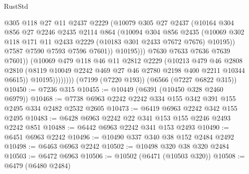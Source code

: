 \begin{lexlean}{RustStd}
\begin{coremodule}
                            @305
                            @118
                            @27
                            @11
                            @2437
                            @2229
                            (@10079
                              @305
                              @27
                              @2437
                              (@10164
                                @304
                                @856
                                @27
                                @2246
                                @2435
                                @2114
                                @864
                                (@10094
                                  @304
                                  @856
                                  @2435
                                  (@10069
                                    @302
                                    @118
                                    @171
                                    @11
                                    @2433
                                    @2229
                                    (@10183 @301 @2433 @7672 @7676)
                                    @10195))
                                @7587
                                @7590
                                @7593
                                @7596
                                @7601))
                            @10195)))
                      @7630
                      @7633
                      @7636
                      @7639
                      @7601))
                  (@10069
                    @479
                    @118
                    @46
                    @11
                    @2812
                    @2229
                    (@10213
                      @479
                      @46
                      @2808
                      @2810
                      (@8119 @10049 @2242 @469 @27 @46 @2780 @2198 @400 @2211 @10344 @6615))
                    @10195))))))))
    (@7199 (@7220 @193))
    (@6566 (@7227 @6822 @315))
@10450 := @7236 @315
@10455 := @10449 (@6391 (@10450 @328 @2460 @6979))
@10468 := @7738 @6963 @2242 @2242 @334 @155 @342 @391 @155 @2495 @334 @2482 @2532 @2605
@10473 := @6419 @6963 @2242 @342 @155 @2495
@10483 := @6428 @6963 @2242 @22 @341 @153 @155 @2246 @2493 @2242 @851
@10488 := @6442 @6963 @2242 @341 @153 @2493
@10490 := @6451 @6963 @2242
@10496 := @10490 @337 @340 @38 @152 @2484 @2492
@10498 := @6463 @6963 @2242
@10502 := @10498 @320 @38 @320 @2484
@10503 := @6472 @6963
@10506 := @10502 (@6471 (@10503 @320))
@10508 := @6479 (@6480 @2484)

\end{coremodule}
\end{lexlean}
